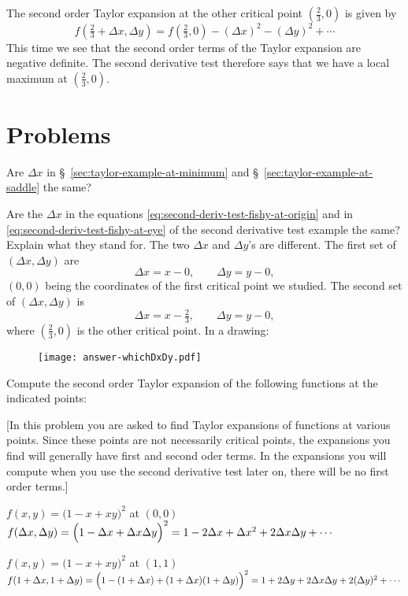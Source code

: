 The second order Taylor expansion at the other critical point $(\frac 23, 0)$ is given by
\begin{equation}
f(\tfrac23 + \Delta x, \Delta y)
= f(\tfrac23, 0) - (\Delta x)^2 - (\Delta y)^2 + \cdots
\label{eq:second-deriv-test-fishy-at-eye}
\end{equation}
This time we see that the second order terms of the Taylor expansion are negative definite. The second derivative test therefore says that we have a local maximum at $(\frac 23, 0)$.




\section{Problems}  
\begin{multicols}{2}
\problemfont
{} Are $\Delta x$ in \S~\ref{sec:taylor-example-at-minimum}
and \S~\ref{sec:taylor-example-at-saddle} the same?

Are the $\Delta x$ in the equations \eqref{eq:second-deriv-test-fishy-at-origin} and
in \eqref{eq:second-deriv-test-fishy-at-eye} of the second derivative test example
the same?  Explain what they stand for.
\answer
The two $\Delta x$ and $\Delta y$'s are different.  The first set of $(\Delta
x,\Delta y)$ are 
\[
  \Delta x = x-0, \qquad \Delta y = y-0,
\]
$(0,0)$ being the coordinates of the first critical point we studied.  The second set
of $(\Delta x,\Delta y)$ is
\[
  \Delta x = x-\tfrac23, \qquad \Delta y = y-0,
\]
where $(\frac23, 0)$ is the other critical point.  In a drawing:
\begin{figure}[h]
\texttt{[image: answer-whichDxDy.pdf]}
\end{figure}
\endanswer

\problem
Compute the second order Taylor expansion of the following functions
at the indicated points:

[In this problem you are asked to find Taylor expansions of functions
at various points.  Since these points are not necessarily critical points, the
expansions you find will generally have first and second oder terms.
In the expansions you will compute when you use the second derivative
test later on, there will be no first order terms.]

\subprob $f(x, y) =\bigl(1-x+xy\bigr)^2$ at $(0,0)$
\answer 
$f(\Delta x, \Delta y)
= \Bigl(1-\Delta x+\Delta x\Delta y\Bigr)^2
= 1-2\Delta x+\Delta x^2+2\Delta x\Delta
y+\cdots$
\endanswer

\subprob  $f(x, y) =\bigl(1-x+xy\bigr)^2$ at $(1,1)$ 
\answer
$f(1+\Delta x, 1+\Delta y)
= \Bigl(1-(1+\Delta x)+(1+\Delta x)(1+\Delta y)\Bigr)^2
=
1+2\Delta y+2\Delta x\Delta y+2(\Delta y)^2+\cdots$
\endanswer


\end{multicols}
